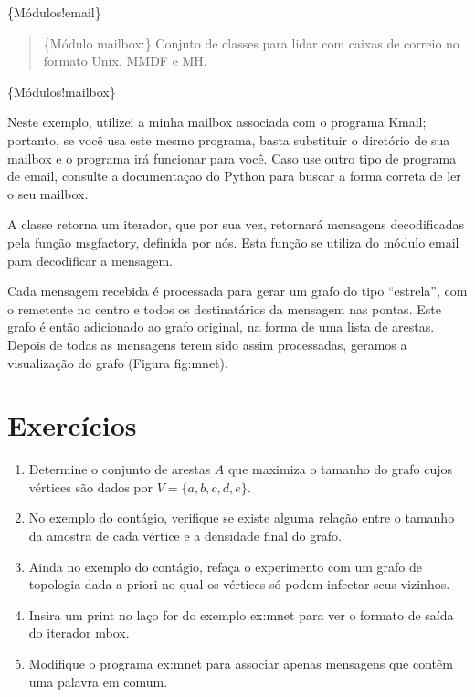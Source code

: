\documentclass[a4paper,10pt,portuguese]{sphinxmanual}
\begin{document}
\{Módulos!email\}
\begin{quote}

\{Módulo mailbox:\} Conjuto de classes para lidar com caixas de
correio no formato Unix, MMDF e MH.
\end{quote}

\{Módulos!mailbox\}

Neste exemplo, utilizei a minha mailbox associada com o programa
Kmail; portanto, se você usa este mesmo programa, basta substituir
o diretório de sua mailbox e o programa irá funcionar para você.
Caso use outro tipo de programa de email, consulte a documentaçao
do Python para buscar a forma correta de ler o seu mailbox.

A classe  retorna um iterador, que por sua vez,
retornará mensagens decodificadas pela função msgfactory, definida
por nós. Esta função se utiliza do módulo email para decodificar a
mensagem.

Cada mensagem recebida é processada para gerar um grafo do tipo
``estrela'', com o remetente no centro e todos os destinatários da
mensagem nas pontas. Este grafo é então adicionado ao grafo
original, na forma de uma lista de arestas. Depois de todas as
mensagens terem sido assim processadas, geramos a visualização do
grafo (Figura fig:mnet).


\chapter{Exercícios}
\label{capgraph:exercicios}\begin{enumerate}
\item {} 
Determine o conjunto de arestas $A$ que maximiza o tamanho
do grafo cujos vértices são dados por $V=\{a,b,c,d,e\}$.

\item {} 
No exemplo do contágio, verifique se existe alguma relação entre o
tamanho da amostra de cada vértice e a densidade final do grafo.

\item {} 
Ainda no exemplo do contágio, refaça o experimento com um grafo de
topologia dada a priori no qual os vértices só podem infectar seus
vizinhos.

\item {} 
Insira um print no laço for do exemplo ex:mnet para ver o formato
de saída do iterador mbox.

\item {} 
Modifique o programa ex:mnet para associar apenas mensagens que
contêm uma palavra em comum.

\end{enumerate}
\end{document}
